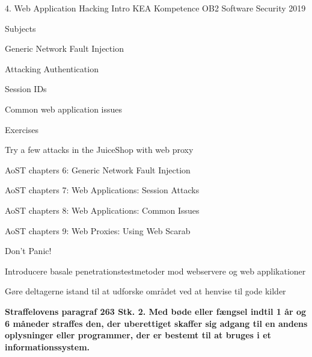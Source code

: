 \documentclass[Screen16to9,17pt]{foils}
\begin{document}
\mytitlepage
{4. Web Application Hacking Intro}
{KEA Kompetence OB2 Software Security 2019}


\begin{list1}
\item Subjects
\begin{list2}
\item Generic Network Fault Injection
\item Attacking Authentication
\item Session IDs
\item Common web application issues
\end{list2}
\item Exercises
\begin{list2}
\item  Try a few attacks in the JuiceShop with web proxy
\end{list2}
\end{list1}


\begin{list1}
\item AoST chapters 6: Generic Network Fault Injection
\item AoST chapters 7: Web Applications: Session  Attacks
\item AoST chapters 8: Web Applications: Common Issues
\item AoST chapters 9: Web Proxies: Using Web Scarab
\end{list1}


\centerline{\color{titlecolor}\LARGE Don't Panic!}


\begin{list1}
\item Introducere basale penetrationstestmetoder mod webservere og web
  applikationer
\item Gøre deltagerne istand til at udforske området ved at henvise
  til gode kilder
\end{list1}



{\bfseries Straffelovens paragraf 263 Stk. 2. Med bøde eller fængsel indtil 1 år og 6 måneder straffes den, der uberettiget skaffer sig adgang til en andens oplysninger eller programmer, der er bestemt til at bruges i et informationssystem. }
\end{document}
